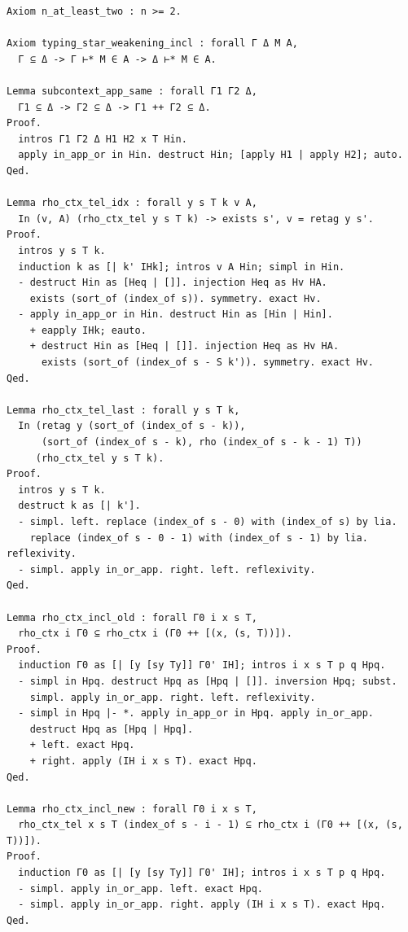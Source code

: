\begin{latin}
\begin{verbatim}
Axiom n_at_least_two : n >= 2.

Axiom typing_star_weakening_incl : forall Γ Δ M A,
  Γ ⊆ Δ -> Γ ⊢* M ∈ A -> Δ ⊢* M ∈ A.

Lemma subcontext_app_same : forall Γ1 Γ2 Δ,
  Γ1 ⊆ Δ -> Γ2 ⊆ Δ -> Γ1 ++ Γ2 ⊆ Δ.
Proof.
  intros Γ1 Γ2 Δ H1 H2 x T Hin.
  apply in_app_or in Hin. destruct Hin; [apply H1 | apply H2]; auto.
Qed.

Lemma rho_ctx_tel_idx : forall y s T k v A,
  In (v, A) (rho_ctx_tel y s T k) -> exists s', v = retag y s'.
Proof.
  intros y s T k.
  induction k as [| k' IHk]; intros v A Hin; simpl in Hin.
  - destruct Hin as [Heq | []]. injection Heq as Hv HA.
    exists (sort_of (index_of s)). symmetry. exact Hv.
  - apply in_app_or in Hin. destruct Hin as [Hin | Hin].
    + eapply IHk; eauto.
    + destruct Hin as [Heq | []]. injection Heq as Hv HA.
      exists (sort_of (index_of s - S k')). symmetry. exact Hv.
Qed.

Lemma rho_ctx_tel_last : forall y s T k,
  In (retag y (sort_of (index_of s - k)),
      (sort_of (index_of s - k), rho (index_of s - k - 1) T))
     (rho_ctx_tel y s T k).
Proof.
  intros y s T k.
  destruct k as [| k'].
  - simpl. left. replace (index_of s - 0) with (index_of s) by lia.
    replace (index_of s - 0 - 1) with (index_of s - 1) by lia. reflexivity.
  - simpl. apply in_or_app. right. left. reflexivity.
Qed.

Lemma rho_ctx_incl_old : forall Γ0 i x s T,
  rho_ctx i Γ0 ⊆ rho_ctx i (Γ0 ++ [(x, (s, T))]).
Proof.
  induction Γ0 as [| [y [sy Ty]] Γ0' IH]; intros i x s T p q Hpq.
  - simpl in Hpq. destruct Hpq as [Hpq | []]. inversion Hpq; subst.
    simpl. apply in_or_app. right. left. reflexivity.
  - simpl in Hpq |- *. apply in_app_or in Hpq. apply in_or_app.
    destruct Hpq as [Hpq | Hpq].
    + left. exact Hpq.
    + right. apply (IH i x s T). exact Hpq.
Qed.

Lemma rho_ctx_incl_new : forall Γ0 i x s T,
  rho_ctx_tel x s T (index_of s - i - 1) ⊆ rho_ctx i (Γ0 ++ [(x, (s, T))]).
Proof.
  induction Γ0 as [| [y [sy Ty]] Γ0' IH]; intros i x s T p q Hpq.
  - simpl. apply in_or_app. left. exact Hpq.
  - simpl. apply in_or_app. right. apply (IH i x s T). exact Hpq.
Qed.


\end{verbatim}
\end{latin}
